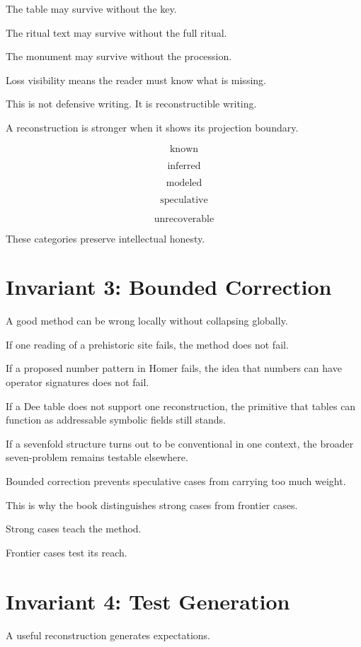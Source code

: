\documentclass[11pt]{book}
\begin{document}
The table may survive without the key.

The ritual text may survive without the full ritual.

The monument may survive without the procession.

Loss visibility means the reader must know what is missing.

This is not defensive writing. It is reconstructible writing.

A reconstruction is stronger when it shows its projection boundary.

\[
\text{known}
\]

\[
\text{inferred}
\]

\[
\text{modeled}
\]

\[
\text{speculative}
\]

\[
\text{unrecoverable}
\]

These categories preserve intellectual honesty.

\section{Invariant 3: Bounded Correction}

A good method can be wrong locally without collapsing globally.

If one reading of a prehistoric site fails, the method does not fail.

If a proposed number pattern in Homer fails, the idea that numbers can have operator signatures does not fail.

If a Dee table does not support one reconstruction, the primitive that tables can function as addressable symbolic fields still stands.

If a sevenfold structure turns out to be conventional in one context, the broader seven-problem remains testable elsewhere.

Bounded correction prevents speculative cases from carrying too much weight.

This is why the book distinguishes strong cases from frontier cases.

Strong cases teach the method.

Frontier cases test its reach.

\section{Invariant 4: Test Generation}

A useful reconstruction generates expectations.
\end{document}
